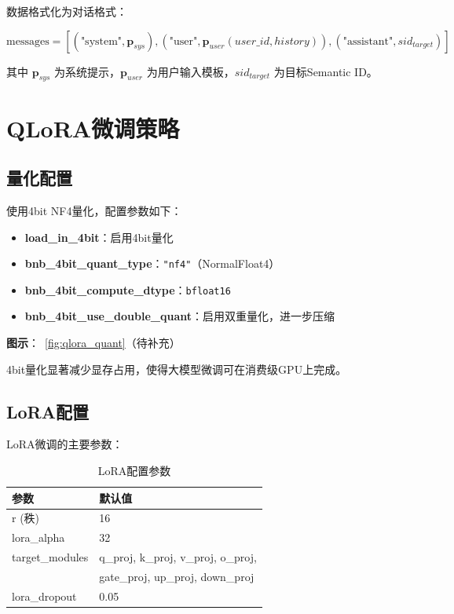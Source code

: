 数据格式化为对话格式：

\begin{equation}
\text{messages} = \left[
    \left(\text{"system"}, \mathbf{p}_{sys}\right),
    \left(\text{"user"}, \mathbf{p}_{user}(user\_id, history)\right),
    \left(\text{"assistant"}, sid_{target}\right)
\right]
\label{eq:chat_format}
\end{equation}

其中 $\mathbf{p}_{sys}$ 为系统提示，$\mathbf{p}_{user}$ 为用户输入模板，$sid_{target}$ 为目标Semantic ID。

\section{QLoRA微调策略}
\label{sec:qlora_config}

\subsection{量化配置}
\label{sec:quantization_config}

使用4bit NF4量化，配置参数如下：

\begin{itemize}
    \item \textbf{load\_in\_4bit}：启用4bit量化
    \item \textbf{bnb\_4bit\_quant\_type}：\verb|"nf4"|（NormalFloat4）
    \item \textbf{bnb\_4bit\_compute\_dtype}：\verb|bfloat16|
    \item \textbf{bnb\_4bit\_use\_double\_quant}：启用双重量化，进一步压缩
\end{itemize}

\textbf{图示}：\figurename~\ref{fig:qlora_quant}（待补充）

4bit量化显著减少显存占用，使得大模型微调可在消费级GPU上完成。

\subsection{LoRA配置}
\label{sec:lora_config}

LoRA微调的主要参数：

\begin{table}[htbp]
\centering
\caption{LoRA配置参数}
\label{tab:lora_config}
\begin{tabular}{ll}
\toprule
参数 & 默认值 \\
\midrule
r (秩) & 16 \\
lora\_alpha & 32 \\
target\_modules & q\_proj, k\_proj, v\_proj, o\_proj, \\
                 & gate\_proj, up\_proj, down\_proj \\
lora\_dropout & 0.05 \\
\bottomrule
\end{tabular}
\end{table}

